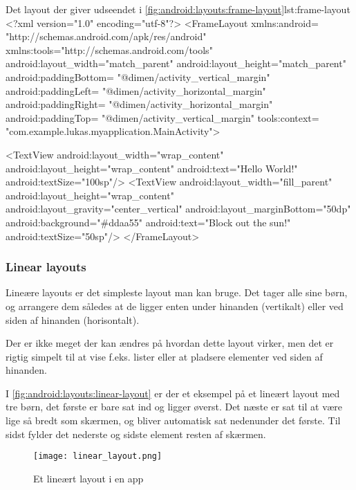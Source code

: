 \begin{XmlCode}{Det layout der giver udseendet i \autoref{fig:android:layouts:frame-layout}}{lst:frame-layout}
	<?xml version="1.0" encoding="utf-8"?>
	<FrameLayout 
		xmlns:android=
			"http://schemas.android.com/apk/res/android"
		xmlns:tools="http://schemas.android.com/tools"
		android:layout_width="match_parent"
		android:layout_height="match_parent"
		android:paddingBottom=
			"@dimen/activity_vertical_margin"
		android:paddingLeft=
			"@dimen/activity_horizontal_margin"
		android:paddingRight=
			"@dimen/activity_horizontal_margin"
		android:paddingTop=
			"@dimen/activity_vertical_margin"
		tools:context=
			"com.example.lukas.myapplication.MainActivity">
	
		<TextView
			android:layout_width="wrap_content"
			android:layout_height="wrap_content"
			android:text="Hello World!"
			android:textSize="100sp"/>
		<TextView
			android:layout_width="fill_parent"
			android:layout_height="wrap_content"
			android:layout_gravity="center_vertical"
			android:layout_marginBottom="50dp"
			android:background="#ddaa55"
			android:text="Block out the sun!"
			android:textSize="50sp"/>
	</FrameLayout>
\end{XmlCode}

\clearpage
\FloatBarrier

\subsubsection{Linear layouts}
Lineære layouts er det simpleste layout man kan bruge. Det tager alle sine 
børn, og arrangere dem således at de ligger enten under hinanden (vertikalt) 
eller ved siden af hinanden (horisontalt).

Der er ikke meget der kan ændres på hvordan dette layout virker, men det er 
rigtig simpelt til at vise f.eks. lister eller at pladsere elementer ved siden 
af hinanden.

I \autoref{fig:android:layouts:linear-layout} er der et eksempel på et lineært 
layout med tre børn, det første er bare sat ind og ligger øverst. Det næste er 
sat til at være lige så bredt som skærmen, og bliver automatisk sat nedenunder 
det første. Til sidst fylder det nederste og sidste element resten af skærmen.

\begin{figure}[h]
	\begin{center}
		\texttt{[image: linear\_layout.png]}
		\caption{Et lineært layout i en app}
		\label{fig:android:layouts:linear-layout}
	\end{center}
\end{figure}

